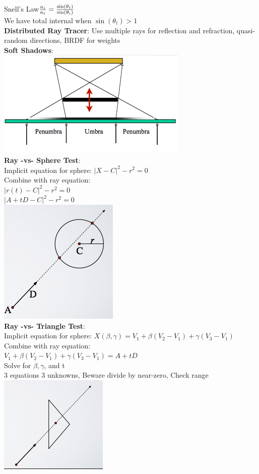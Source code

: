 \documentclass[3pt,landscape]{article}
\begin{document}
\begin{multicols}{3}
Snell's Law$\Large{\frac{n_i}{n_t}  = \frac{\sin(\theta_t)}{\sin(\theta_i)}}$\\
We have total internal when $\sin(\theta_t) > 1$\\
{\bf Distributed Ray Tracer}: Use multiple rays for reflection and refraction, quasi-random directions, BRDF for weights\\
{\bf Soft Shadows}: \\
\includegraphics[scale=1.0]{images/softshadow}\\
{\bf Ray -vs- Sphere Test}:\\
Implicit equation for sphere: $|X-C| ^ 2 - r^2  = 0$\\
Combine with ray equation:\\
$|r(t)-C| ^ 2 - r^2  = 0$\\
$| A+tD-C| ^ 2 - r^2  = 0$\\
\includegraphics[scale=1.0]{images/raycircle}\\
{\bf Ray -vs- Triangle Test}:\\
Implicit equation for sphere: $X(\beta, \gamma) = V_1 + \beta(V_2 - V_1)  + \gamma(V_3 - V_1)$\\
Combine with ray equation:\\
$ V_1 + \beta(V_2 - V_1)  + \gamma(V_3 - V_1) = A+tD$\\
Solve for $\beta, \gamma$, and t\\
3 equations 3 unknowns, Beware divide by near-zero, Check range\\
\includegraphics[scale=1.0]{images/raytri}



\end{multicols}
\end{document}
